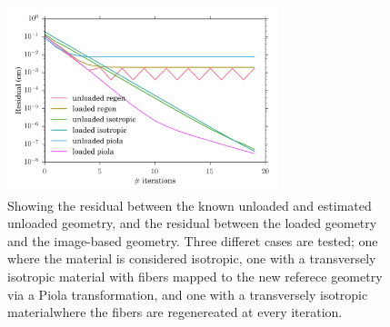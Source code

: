 

\begin{figure}[htbp]
  \centering
    \includegraphics[width=0.7\textwidth]{numerical_experiments/unloading/unloaded_error.png}
\caption{Showing the residual between the known unloaded and estimated
unloaded geometry, and the residual between the loaded geometry and
the image-based geometry. Three differet cases are tested; one where
the material is considered isotropic, one with a transversely
isotropic material with fibers mapped to the new referece geometry via
a Piola transformation, and one with a transversely
isotropic materialwhere the fibers are regenereated at
every iteration. }
\label{fig:unloaded_error}
\end{figure}







